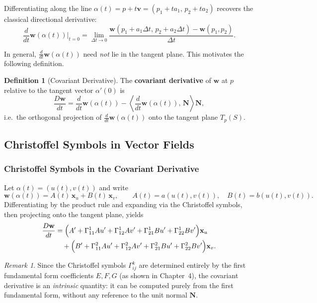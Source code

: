 \documentclass[10pt, a4paper]{article}
\theoremstyle{plain}
\theoremstyle{definition}
\newtheorem{definition}[theorem]{Definition}
\theoremstyle{remark}
\newtheorem{remark}[theorem]{Remark}
\begin{document}
Differentiating along the line $\alpha(t) = p + t\mathbf{v} = (p_1 + ta_1,\, p_2 + ta_2)$
recovers the classical directional derivative:
\[
  \frac{d}{dt}\mathbf{w}(\alpha(t))\bigg|_{t=0}
  = \lim_{\Delta t \to 0}
    \frac{\mathbf{w}(p_1 + a_1\Delta t,\, p_2 + a_2\Delta t) - \mathbf{w}(p_1, p_2)}{\Delta t}.
\]

In general, $\frac{d}{dt}\mathbf{w}(\alpha(t))$ need \emph{not} lie in the tangent plane.
This motivates the following definition.

\begin{definition}[Covariant Derivative]
  The \textbf{covariant derivative} of $\mathbf{w}$ at $p$ relative to the tangent vector
  $\alpha'(0)$ is
  \[
    \frac{D\mathbf{w}}{dt}
    = \frac{d}{dt}\mathbf{w}(\alpha(t))
    - \left\langle \frac{d}{dt}\mathbf{w}(\alpha(t)),\, \mathbf{N} \right\rangle \mathbf{N},
  \]
  i.e.\ the orthogonal projection of $\frac{d}{dt}\mathbf{w}(\alpha(t))$ onto the tangent
  plane $T_p(S)$.
\end{definition}

\pagebreak
\subsection{Christoffel Symbols in Vector Fields}

\subsubsection*{Christoffel Symbols in the Covariant Derivative}

Let $\alpha(t) = (u(t), v(t))$ and write
\[
  \mathbf{w}(\alpha(t)) = A(t)\,\mathbf{x}_u + B(t)\,\mathbf{x}_v,
  \qquad A(t) = a(u(t), v(t)),\quad B(t) = b(u(t), v(t)).
\]
Differentiating by the product rule and expanding via the Christoffel symbols, then projecting
onto the tangent plane, yields
\begin{align*}
  \frac{D\mathbf{w}}{dt}
  &= \Bigl(A' + \Gamma_{11}^1 Au' + \Gamma_{12}^1 Av'
           + \Gamma_{21}^1 Bu' + \Gamma_{22}^1 Bv'\Bigr)\mathbf{x}_u \\
  &\quad + \Bigl(B' + \Gamma_{11}^2 Au' + \Gamma_{12}^2 Av'
                   + \Gamma_{21}^2 Bu' + \Gamma_{22}^2 Bv'\Bigr)\mathbf{x}_v.
\end{align*}

\begin{remark}
  Since the Christoffel symbols $\Gamma_{ij}^k$ are determined entirely by the first fundamental
  form coefficients $E, F, G$ (as shown in Chapter~4), the covariant derivative is an
  \emph{intrinsic} quantity: it can be computed purely from the first fundamental form, without
  any reference to the unit normal $\mathbf{N}$.
\end{remark}
\end{document}
